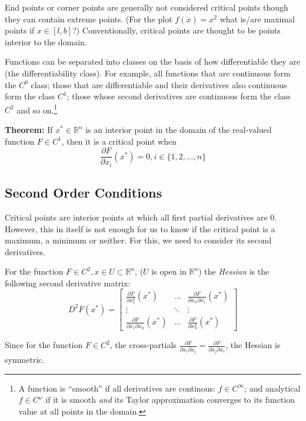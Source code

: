 \documentclass[11pt,]{article}
\let\rmarkdownfootnote\footnote%
\def\footnote{\protect\rmarkdownfootnote}
\begin{document}
End points or corner points are generally not considered critical points
though they can contain extreme points. (For the plot \(f(x)=x^2\) what
is/are maximal points if \(x\in [l, b]\)?) Conventionally, critical
points are thought to be points interior to the domain.

Functions can be separated into classes on the basis of how
differentiable they are (the differentiability class). For example, all
functions that are continuous form the \(C^0\) class; those that are
differentiable and their derivatives also continuous form the class
\(C^1\); those whose second derivatives are continuous form the class
\(C^2\) and so on.\footnote{A function is ``smooth'' if all derivatives
  are continous: \(f\in C^{\infty}\); and analytical
  \(f \in C^{\omega}\) if it is smooth \emph{and} its Taylor
  approximation converges to its function value at all points in the
  domain.}

\textbf{Theorem:} If \(x^*\in \mathbb{R}^n\) is an interior point in the
domain of the real-valued function \(F\in C^1\), then it is a critical
point when \[
  \frac{\partial F}{\partial x_i}(x^*) = 0, i\in \{1, 2,\hdots, n\}
\]

\subsection{Second Order Conditions}\label{second-order-conditions}

Critical points are interior points at which all first partial
derivatives are 0. However, this in itself is not enough for us to know
if the critical point is a maximum, a minimum or neither. For this, we
need to consider its second derivatives.

For the function \(F\in C^2, x\in U\subset \mathbb{R}^n\), (\(U\) is
open in \(\mathbb{R}^n\)) the \emph{Hessian} is the following second
derivative matrix: \[
D^2F(x^*) = \begin{bmatrix}
\frac{\partial F}{\partial x_1^2}(x^*) & \hdots &\frac{\partial F}{\partial x_n\partial x_1}(x^*)\\
\vdots & \ddots & \vdots\\
\frac{\partial F}{\partial x_1\partial x_n}(x^*) & \hdots & \frac{\partial F}{\partial x_n^2}(x^*)
\end{bmatrix}
\]

Since for the function \(F\in C^2\), the cross-partials
\(\frac{\partial F}{\partial x_i \partial x_j} = \frac{\partial F}{\partial x_j \partial x_i}\),
the Hessian is symmetric.
\end{document}
